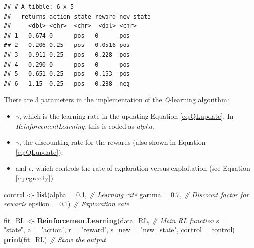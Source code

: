 \documentclass[]{krantz}
\makeatletter
\newenvironment{Shaded}{\begin{snugshade}}{\end{snugshade}}
\newcommand{\CommentTok}[1]{\textcolor[rgb]{0.37,0.37,0.37}{\textit{#1}}}
\newcommand{\DataTypeTok}[1]{\textcolor[rgb]{0.27,0.27,0.27}{#1}}
\newcommand{\FloatTok}[1]{\textcolor[rgb]{0.06,0.06,0.06}{#1}}
\newcommand{\KeywordTok}[1]{\textcolor[rgb]{0.27,0.27,0.27}{\textbf{#1}}}
\newcommand{\NormalTok}[1]{#1}
\newcommand{\StringTok}[1]{\textcolor[rgb]{0.5,0.5,0.5}{#1}}
\providecommand{\tightlist}{%
  \setlength{\itemsep}{0pt}\setlength{\parskip}{0pt}}
\newenvironment{kframe}{%
\medskip{}
\setlength{\fboxsep}{.8em}
 \def\at@end@of@kframe{}%
 \ifinner\ifhmode%
  \def\at@end@of@kframe{\end{minipage}}%
  \begin{minipage}{\columnwidth}%
 \fi\fi%
 \def\FrameCommand##1{\hskip\@totalleftmargin \hskip-\fboxsep
 \colorbox{shadecolor}{##1}\hskip-\fboxsep
     \hskip-\linewidth \hskip-\@totalleftmargin \hskip\columnwidth}%
 \MakeFramed {\advance\hsize-\width
   \@totalleftmargin\z@ \linewidth\hsize
   \@setminipage}}%
 {\par\unskip\endMakeFramed%
 \at@end@of@kframe}
\renewenvironment{Shaded}{\begin{kframe}}{\end{kframe}}
\theoremstyle{definition}
\theoremstyle{definition}
\theoremstyle{definition}
\theoremstyle{remark}
\makeatother
\begin{document}
\begin{verbatim}
## # A tibble: 6 x 5
##   returns action state reward new_state
##     <dbl> <chr>  <chr>  <dbl> <chr>    
## 1   0.674 0      pos   0      pos      
## 2   0.206 0.25   pos   0.0516 pos      
## 3   0.911 0.25   pos   0.228  pos      
## 4   0.290 0      pos   0      pos      
## 5   0.651 0.25   pos   0.163  pos      
## 6   1.15  0.25   pos   0.288  neg
\end{verbatim}

\normalsize

There are 3 parameters in the implementation of the \emph{Q}-learning
algorithm:

\begin{itemize}
\tightlist
\item
  \(\gamma\), which is the learning rate in the updating Equation
  \eqref{eq:QLupdate}. In \emph{ReinforcementLearning}, this is coded as
  \emph{alpha};\\
\item
  \(\gamma\), the discounting rate for the rewards (also shown in
  Equation \eqref{eq:QLupdate});
\item
  and \(\epsilon\), which controls the rate of exploration versus
  exploitation (see Equation \eqref{eq:egreedy}).
\end{itemize}

\footnotesize

\begin{Shaded}
\begin{Highlighting}[]
\NormalTok{control <-}\StringTok{ }\KeywordTok{list}\NormalTok{(}\DataTypeTok{alpha =} \FloatTok{0.1}\NormalTok{,                       }\CommentTok{# Learning rate}
                \DataTypeTok{gamma =} \FloatTok{0.7}\NormalTok{,                       }\CommentTok{# Discount factor for rewards}
                \DataTypeTok{epsilon =} \FloatTok{0.1}\NormalTok{)                     }\CommentTok{# Exploration rate}

\NormalTok{fit_RL <-}\StringTok{ }\KeywordTok{ReinforcementLearning}\NormalTok{(data_RL,           }\CommentTok{# Main RL function}
                               \DataTypeTok{s =} \StringTok{"state"}\NormalTok{, }
                               \DataTypeTok{a =} \StringTok{"action"}\NormalTok{, }
                               \DataTypeTok{r =} \StringTok{"reward"}\NormalTok{, }
                               \DataTypeTok{s_new =} \StringTok{"new_state"}\NormalTok{, }
                               \DataTypeTok{control =}\NormalTok{ control)}
\KeywordTok{print}\NormalTok{(fit_RL)   }\CommentTok{# Show the output}
\end{Highlighting}
\end{Shaded}
\end{document}
